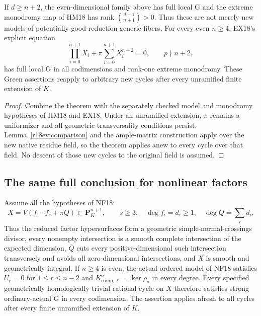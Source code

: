 \begin{corollary}
\label{r18ev:deep}
If $d\ge n+2$, the even-dimensional family above has full
local G and the extreme monodromy map of HM18 has rank
$\binom{d-1}{n+1}>0$.  Thus these are not merely new
models of potentially good-reduction generic fibers.
For every even $n\ge4$, EX18's explicit equation
\[
                 \prod_{i=0}^{n+1}X_i
                       +\pi\sum_{i=0}^{n+1}X_i^{n+2}=0,
 \qquad p\nmid n+2,
 \tag{EV18.12}\label{r18ev:explicit}
\]
has full local G in all codimensions and rank-one extreme
monodromy.  These Green assertions reapply to arbitrary
new cycles after every unramified finite extension of $K$.
\end{corollary}

\begin{proof}
Combine the theorem with the separately checked model and
monodromy hypotheses of HM18 and EX18.
Under an unramified extension, $\pi$ remains a uniformizer
and all geometric transversality conditions persist.
Lemma~\ref{r18ev:comparison} and the ample-matrix construction
apply over the new native residue field, so the theorem
applies anew to every cycle over that field.
No descent of those new cycles to the original field is
assumed.
\end{proof}

\subsection{The same full conclusion for nonlinear factors}

\begin{corollary}
\label{r18ev:nonlinear}
Assume all the hypotheses of NF18:
\[
 X=V(f_1\cdots f_s+\pi Q)\subset\mathbf P_K^{n+1},
 \qquad s\ge3,\quad \deg f_i=d_i\ge1,\quad
 \deg Q=\sum_i d_i.
 \tag{EV18.13}\label{r18ev:nonlinear-model}
\]
Thus the reduced factor hypersurfaces form a geometric
simple-normal-crossings divisor, every nonempty intersection
is a smooth complete intersection of the expected dimension,
$\bar Q$ cuts every positive-dimensional such intersection
transversely and avoids all zero-dimensional intersections,
and $X$ is smooth and geometrically integral.
If $n\ge4$ is even, the actual ordered model of NF18 satisfies
$U_r=0$ for $1\le r\le n-2$ and
$K_{\mathrm{comp},\ell}^a=\ker\rho_a$ in every degree.
Every specified geometrically homologically trivial rational
cycle on $X$ therefore satisfies strong ordinary-actual G
in every codimension.  The assertion applies afresh to
all cycles after every finite unramified extension of $K$.
\end{corollary}

